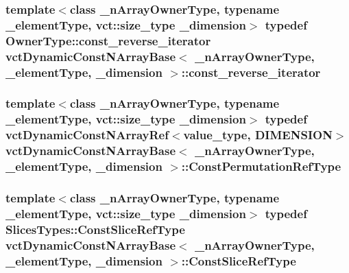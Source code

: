 \hypertarget{classvct_dynamic_const_n_array_base_a133cecf87f369296ad391ce3b697466b}{
\subsubsection[{const\-\_\-reverse\-\_\-iterator}]{\setlength{\rightskip}{0pt plus 5cm}template$<$class \-\_\-n\-Array\-Owner\-Type, typename \-\_\-element\-Type, vct\-::size\-\_\-type \-\_\-dimension$>$ typedef Owner\-Type\-::const\-\_\-reverse\-\_\-iterator {\bf vct\-Dynamic\-Const\-N\-Array\-Base}$<$ \-\_\-n\-Array\-Owner\-Type, \-\_\-element\-Type, \-\_\-dimension $>$\-::{\bf const\-\_\-reverse\-\_\-iterator}}}\label{classvct_dynamic_const_n_array_base_a133cecf87f369296ad391ce3b697466b}
\hypertarget{classvct_dynamic_const_n_array_base_a412fcb88d50ea2e1d809efab113968fc}{
\subsubsection[{Const\-Permutation\-Ref\-Type}]{\setlength{\rightskip}{0pt plus 5cm}template$<$class \-\_\-n\-Array\-Owner\-Type, typename \-\_\-element\-Type, vct\-::size\-\_\-type \-\_\-dimension$>$ typedef {\bf vct\-Dynamic\-Const\-N\-Array\-Ref}$<$value\-\_\-type, {\bf D\-I\-M\-E\-N\-S\-I\-O\-N}$>$ {\bf vct\-Dynamic\-Const\-N\-Array\-Base}$<$ \-\_\-n\-Array\-Owner\-Type, \-\_\-element\-Type, \-\_\-dimension $>$\-::{\bf Const\-Permutation\-Ref\-Type}}}\label{classvct_dynamic_const_n_array_base_a412fcb88d50ea2e1d809efab113968fc}
\hypertarget{classvct_dynamic_const_n_array_base_ad4a09eb0789ba4c5b8d799fbe0ee3d79}{
\subsubsection[{Const\-Slice\-Ref\-Type}]{\setlength{\rightskip}{0pt plus 5cm}template$<$class \-\_\-n\-Array\-Owner\-Type, typename \-\_\-element\-Type, vct\-::size\-\_\-type \-\_\-dimension$>$ typedef Slices\-Types\-::\-Const\-Slice\-Ref\-Type {\bf vct\-Dynamic\-Const\-N\-Array\-Base}$<$ \-\_\-n\-Array\-Owner\-Type, \-\_\-element\-Type, \-\_\-dimension $>$\-::{\bf Const\-Slice\-Ref\-Type}}}\label{classvct_dynamic_const_n_array_base_ad4a09eb0789ba4c5b8d799fbe0ee3d79}

